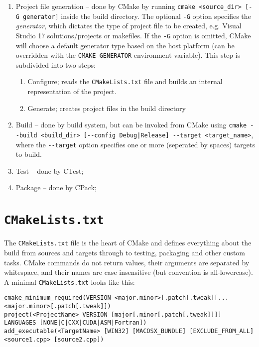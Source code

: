 \documentclass[8pt, table, xcdraw]{article}%
\begin{document}
\begin{enumerate}
    \item Project file generation -- done by CMake by running \lstinline{cmake <source_dir> [-G generator]} inside the build directory. The optional \lstinline{-G} option specifies the \emph{generator}, which dictates the type of project file to be created, e.g. Visual Studio 17 solutions/projects or makefiles. If the \lstinline{-G} option is omitted, CMake will choose a default generator type based on the host platform (can be overridden with the \lstinline{CMAKE_GENERATOR} environment variable). This step is subdivided into two steps:
    \begin{enumerate}
        \item Configure; reads the \lstinline{CMakeLists.txt} file and builds an internal representation of the project.
        \item Generate; creates project files in the build directory
    \end{enumerate}
    \item Build -- done by build system, but can be invoked from CMake using \lstinline{cmake --build <build_dir> [--config Debug|Release] --target <target_name>}, where the \lstinline{--target} option specifies one or more (seperated by spaces) targets to build.
    \item Test -- done by CTest;
    \item Package -- done by CPack;
\end{enumerate}

\section{\lstinline{CMakeLists.txt}}

The \lstinline{CMakeLists.txt} file is the heart of CMake and defines everything about the build from sources and targets through to testing, packaging and other custom tasks. CMake commands do not return values, their arguments are separated by whitespace, and their names are case insensitive (but convention is all-lowercase). A minimal \lstinline{CMakeLists.txt} looks like this:

\begin{lstlisting}
cmake_minimum_required(VERSION <major.minor>[.patch[.tweak][...<major.minor>[.patch[.tweak]])
project(<ProjectName> VERSION [major[.minor[.patch[.tweak]]]] LANGUAGES [NONE|C|CXX|CUDA|ASM|Fortran])
add_executable(<TargetName> [WIN32] [MACOSX_BUNDLE] [EXCLUDE_FROM_ALL] <source1.cpp> [source2.cpp])
\end{lstlisting}
\end{document}
